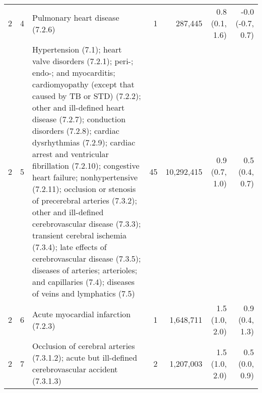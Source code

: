 \begin{tabular}{llp{6.5cm}rrrr}
   2 &  4 & Pulmonary heart disease (7.2.6) &  1 & 287,445 & 0.8 (0.1, 1.6) & -0.0 (-0.7, 0.7) \\ 
   2 &  5 & Hypertension (7.1); heart valve disorders (7.2.1); peri-; endo-; and myocarditis; cardiomyopathy (except that caused by TB or STD) (7.2.2); other and ill-defined heart disease (7.2.7); conduction disorders (7.2.8); cardiac dysrhythmias (7.2.9); cardiac arrest and ventricular fibrillation (7.2.10); congestive heart failure; nonhypertensive (7.2.11); occlusion or stenosis of precerebral arteries (7.3.2); other and ill-defined cerebrovascular disease (7.3.3); transient cerebral ischemia (7.3.4); late effects of cerebrovascular disease (7.3.5); diseases of arteries; arterioles; and capillaries (7.4); diseases of veins and lymphatics (7.5) & 45 & 10,292,415 & 0.9 (0.7, 1.0) & 0.5 (0.4, 0.7) \\ 
   2 &  6 & Acute myocardial infarction (7.2.3) &  1 & 1,648,711 & 1.5 (1.0, 2.0) & 0.9 (0.4, 1.3) \\ 
   2 &  7 & Occlusion of cerebral arteries (7.3.1.2); acute but ill-defined cerebrovascular accident (7.3.1.3) &  2 & 1,207,003 & 1.5 (1.0, 2.0) & 0.5 (0.0, 0.9) \\ 
   \hline
\end{tabular}

